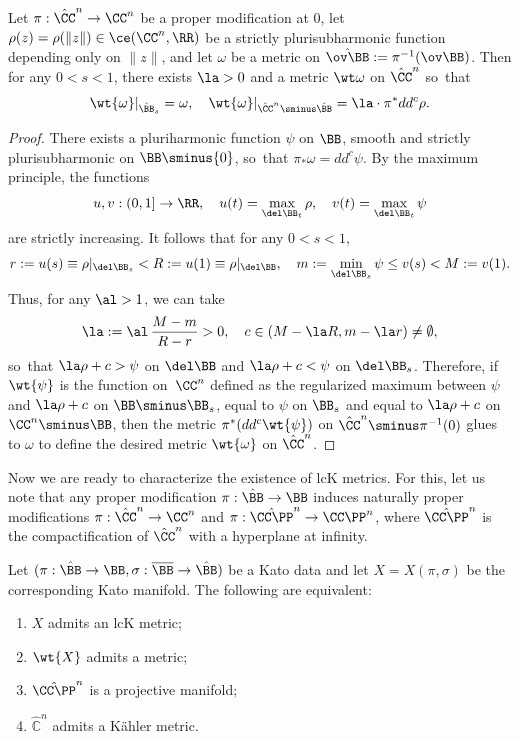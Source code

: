 \begin{lemma}\label{extKA}
Let $\pi:\hat\CC^n\to \CC^n$ be a proper modification at $0$, let $\rho(z)=\rho(\|z\|)\in\ce(\CC^n,\RR)$ be a strictly plurisubharmonic function depending only on $\|z\|$, and let $\omega$ be a \Ka metric on $\hat{\ov\BB}:=\pi^{-1}(\ov\BB)$. Then for any $0<s<1$, there exists $\la>0$ and a \Ka metric $\wt \omega$ on $\hat\CC^n$ so~that
\begin{equation*}
\wt{\omega}|_{\hat\BB_s}=\omega, \quad\wt{\omega}|_{\hat\CC^n\sminus \hat\BB}=\la\cdot\pi^*dd^c\rho.
\end{equation*}
\end{lemma}
\begin{proof}
There exists a pluriharmonic function $\psi$ on $\BB$, smooth and strictly plurisubharmonic on $\BB\sminus \{0\}$, so~that $\pi_*\omega=dd^c\psi$. By the maximum principle, the functions
\begin{equation*}
u,v:(0,1]\to \RR, \quad u(t)=\max_{\del\BB_t}\rho, \quad v(t)=\max_{\del\BB_t}\psi
\end{equation*}
are strictly increasing. It follows that for any $0<s<1$,
\begin{gather*}
r:=u(s)\equiv \rho|_{\del\BB_s}<R:=u(1)\equiv \rho|_{\del\BB}, \quad m:=\min_{\del\BB_s}\psi\leq v(s)<M:=v(1).
\end{gather*}
Thus, for any $\al>1$, we can take
\begin{equation*}
\la:=\al\,\frac{M-m}{R-r}>0, \quad c\in\left(M-\la R,m-\la r\right)\neq\emptyset,
\end{equation*}
so~that $\la\rho+c>\psi$ on $\del\BB$ and $\la\rho+c<\psi$ on $\del\BB_s$. Therefore, if $\wt{\psi}$ is the function on~$\CC^n$ defined as the regularized maximum between $\psi$ and $\la\rho+c$ on $\BB\sminus \BB_s$, equal to $\psi$ on $\BB_s$ and equal to $\la\rho+c$ on $\CC^n\sminus \BB$, then the metric $\pi^*(dd^c\wt{\psi})$ on $\hat\CC^n\sminus \pi^{-1}(0)$ glues to $\omega$ to define the desired metric $\wt{\omega}$ on $\hat\CC^n$.
\end{proof}

Now we are ready to characterize the existence of lcK metrics. For this, let us note that any proper modification $\pi:\hat\BB\to\BB$ induces naturally proper modifications $\pi:\hat\CC^n\to\CC^n$ and $\pi:\hat{\CC\PP}^n\to\CC\PP^n$, where $\hat{\CC\PP}^n$ is the compactification of $\hat\CC^n$ with a hyperplane at infinity.

\begin{theorem}\label{lcK}
Let $(\pi:\hat\BB\to\BB,\sigma:\overline{\BB}\to\hat\BB)$ be a Kato data and let $X=X(\pi,\sigma)$ be the corresponding Kato manifold.
The following are equivalent:
\begin{enumerate}
\item\label{lcK1} $X$ admits an lcK metric;
\item\label{lcK2} $\wt{X}$ admits a \Ka metric;
\item\label{lcK3} $\hat{\CC\PP}^n$ is a projective manifold;
\item\label{lcK4} $\hat{\mathbb{C}}^n$ admits a Kähler metric.

\end{enumerate}
\end{theorem}

